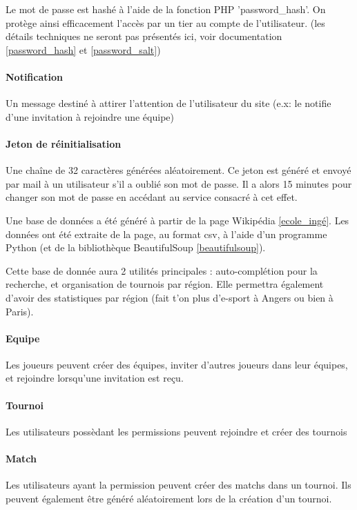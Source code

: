 \documentclass[10pt]{article}
\begin{document}
	Le mot de passe est hashé à l'aide de la fonction PHP 'password\_hash'.
	On protège ainsi efficacement l'accès par un tier au compte de l'utilisateur.
	(les détails techniques ne seront pas présentés ici, voir documentation \ref{password_hash} et \ref{password_salt})
	
	\paragraph{Notification} Un message destiné à attirer l'attention de l'utilisateur du site (e.x: le notifie d'une invitation à rejoindre une équipe)
	\paragraph{Jeton de réinitialisation} Une chaîne de 32 caractères générées aléatoirement.
	Ce jeton est généré et envoyé par mail à un utilisateur s'il a oublié son mot de passe.
	Il a alors 15 minutes pour changer son mot de passe en accédant au service consacré à cet effet.
      
	Une base de données a été généré à partir de la page Wikipédia \ref{ecole_ingé}.
	Les données ont été extraite de la page, au format csv, à l'aide d'un programme Python (et de la bibliothèque BeautifulSoup \ref{beautifulsoup}).
	
	Cette base de donnée aura 2 utilités principales : auto-complétion pour la recherche, et organisation de tournois par région.
	Elle permettra également d'avoir des statistiques par région (fait t'on plus d'e-sport à Angers ou bien à Paris).
	
	\paragraph{Equipe} Les joueurs peuvent créer des équipes, inviter d'autres joueurs dans leur équipes, et rejoindre lorsqu'une invitation est reçu.
	\paragraph{Tournoi} Les utilisateurs possèdant les permissions peuvent rejoindre et créer des tournois
	\paragraph{Match} Les utilisateurs ayant la permission peuvent créer des matchs dans un tournoi.
	Ils peuvent également être généré aléatoirement lors de la création d'un tournoi.
\end{document}
